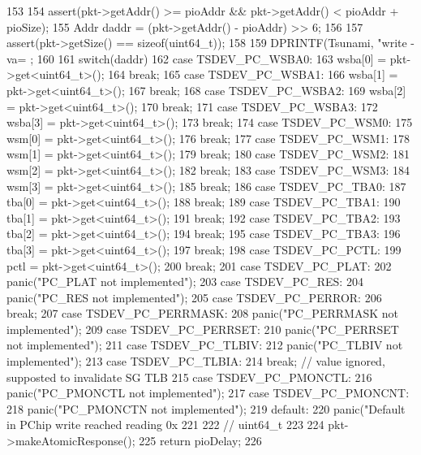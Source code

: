 \begin{DoxyCode}
153 {
154     assert(pkt->getAddr() >= pioAddr && pkt->getAddr() < pioAddr + pioSize);
155     Addr daddr = (pkt->getAddr() - pioAddr) >> 6;
156 
157     assert(pkt->getSize() == sizeof(uint64_t));
158 
159     DPRINTF(Tsunami, "write - va=%
      ;
160 
161     switch(daddr) {
162         case TSDEV_PC_WSBA0:
163               wsba[0] = pkt->get<uint64_t>();
164               break;
165         case TSDEV_PC_WSBA1:
166               wsba[1] = pkt->get<uint64_t>();
167               break;
168         case TSDEV_PC_WSBA2:
169               wsba[2] = pkt->get<uint64_t>();
170               break;
171         case TSDEV_PC_WSBA3:
172               wsba[3] = pkt->get<uint64_t>();
173               break;
174         case TSDEV_PC_WSM0:
175               wsm[0] = pkt->get<uint64_t>();
176               break;
177         case TSDEV_PC_WSM1:
178               wsm[1] = pkt->get<uint64_t>();
179               break;
180         case TSDEV_PC_WSM2:
181               wsm[2] = pkt->get<uint64_t>();
182               break;
183         case TSDEV_PC_WSM3:
184               wsm[3] = pkt->get<uint64_t>();
185               break;
186         case TSDEV_PC_TBA0:
187               tba[0] = pkt->get<uint64_t>();
188               break;
189         case TSDEV_PC_TBA1:
190               tba[1] = pkt->get<uint64_t>();
191               break;
192         case TSDEV_PC_TBA2:
193               tba[2] = pkt->get<uint64_t>();
194               break;
195         case TSDEV_PC_TBA3:
196               tba[3] = pkt->get<uint64_t>();
197               break;
198         case TSDEV_PC_PCTL:
199               pctl = pkt->get<uint64_t>();
200               break;
201         case TSDEV_PC_PLAT:
202               panic("PC_PLAT not implemented\n");
203         case TSDEV_PC_RES:
204               panic("PC_RES not implemented\n");
205         case TSDEV_PC_PERROR:
206               break;
207         case TSDEV_PC_PERRMASK:
208               panic("PC_PERRMASK not implemented\n");
209         case TSDEV_PC_PERRSET:
210               panic("PC_PERRSET not implemented\n");
211         case TSDEV_PC_TLBIV:
212               panic("PC_TLBIV not implemented\n");
213         case TSDEV_PC_TLBIA:
214               break; // value ignored, supposted to invalidate SG TLB
215         case TSDEV_PC_PMONCTL:
216               panic("PC_PMONCTL not implemented\n");
217         case TSDEV_PC_PMONCNT:
218               panic("PC_PMONCTN not implemented\n");
219         default:
220             panic("Default in PChip write reached reading 0x%
221 
222     } // uint64_t
223 
224     pkt->makeAtomicResponse();
225     return pioDelay;
226 }
\end{DoxyCode}


